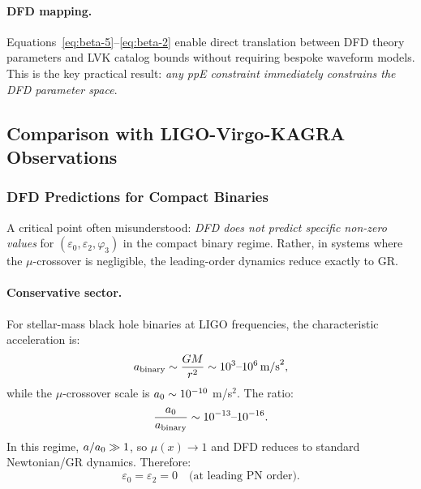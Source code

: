 \paragraph{DFD mapping.}
Equations~\eqref{eq:beta-5}--\eqref{eq:beta-2} enable direct translation between DFD theory parameters and LVK catalog bounds without requiring bespoke waveform models. This is the key practical result: \textit{any ppE constraint immediately constrains the DFD parameter space}.

\subsection{Comparison with LIGO-Virgo-KAGRA Observations}\label{sec:gw-lvk}

\subsubsection{DFD Predictions for Compact Binaries}\label{sec:gw-dfd-pred}

A critical point often misunderstood: \textit{DFD does not predict specific non-zero values} for $(\varepsilon_0, \varepsilon_2, \varphi_3)$ in the compact binary regime. Rather, in systems where the $\mu$-crossover is negligible, the leading-order dynamics reduce exactly to GR.

\paragraph{Conservative sector.}
For stellar-mass black hole binaries at LIGO frequencies, the characteristic acceleration is:
\begin{equation}
a_{\rm binary} \sim \frac{GM}{r^2} \sim 10^{3}\text{--}10^{6}\,\text{m/s}^2,
\end{equation}
while the $\mu$-crossover scale is $a_0 \sim 10^{-10}$ m/s$^2$. The ratio:
\begin{equation}
\frac{a_0}{a_{\rm binary}} \sim 10^{-13}\text{--}10^{-16}.
\end{equation}
In this regime, $a/a_0 \gg 1$, so $\mu(x) \to 1$ and DFD reduces to standard Newtonian/GR dynamics. Therefore:
\begin{equation}
\varepsilon_0 = \varepsilon_2 = 0 \quad \text{(at leading PN order)}.
\end{equation}


